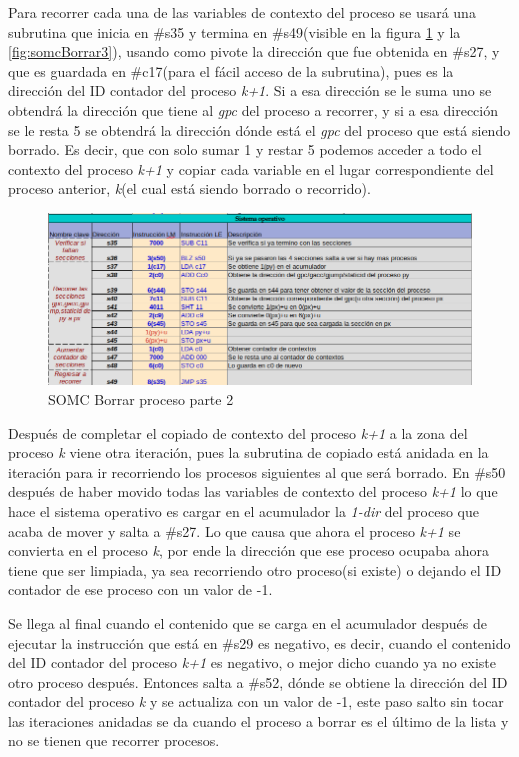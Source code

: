 \documentclass[letterpaper,12pt,oneside]{book}
\begin{document}
		Para recorrer cada una
		de las variables de contexto del proceso se usará una subrutina que 
		inicia en \#s35 y termina en \#s49(visible en la figura \ref{fig:somcBorrar2} y la \ref{fig:somcBorrar3}), usando como pivote la dirección que fue obtenida en \#s27, y que es guardada en
		\#c17(para el fácil acceso de la subrutina), pues es la dirección
		del ID contador del proceso \textit{k+1}. Si a esa dirección se le suma uno se obtendrá la dirección que tiene al \textit{gpc}
		del proceso a recorrer, y si a esa dirección se le resta 5 se obtendrá la dirección dónde está  el \textit{gpc} del proceso que está siendo 
		borrado. Es decir, que con solo sumar 1 y restar 5 podemos acceder a todo el contexto del proceso \textit{k+1} y copiar
		cada variable en el lugar correspondiente del proceso anterior, \textit{k}(el cual está siendo
		borrado o recorrido).
		
		
		\begin{figure}[h]		
			\centering
			\includegraphics[scale=0.53]{media/CARDIACC/SO_Borrar2.png}
			\caption{ SOMC Borrar proceso parte 2}
			\label{fig:somcBorrar2}
		\end{figure}
		
		Después de completar el copiado de contexto del proceso \textit{k+1} a la zona del proceso \textit{k}
		viene otra iteración, pues la subrutina de copiado está anidada en la iteración para
		ir recorriendo los procesos siguientes al que será borrado. En \#s50 después de haber movido todas las variables de contexto del proceso
		\textit{k+1} lo que hace el sistema operativo es cargar en el acumulador la \textit{1-dir} del proceso que acaba de mover y salta a \#s27. Lo 
		que 
		causa
		que ahora el proceso \textit{k+1} se convierta en el proceso \textit{k}, por ende 
		la dirección que ese proceso
		ocupaba ahora tiene que ser limpiada, ya sea recorriendo otro proceso(si existe) o dejando el ID contador de ese proceso
		con un valor de -1. 
		

		Se llega al final cuando el contenido que se carga en el acumulador después de ejecutar la instrucción que está en \#s29 es
		negativo, es decir, cuando el contenido del ID contador del proceso \textit{k+1} es negativo, o mejor dicho
		cuando ya no existe otro proceso después. Entonces salta a \#s52, dónde se obtiene la dirección del ID contador del proceso \textit{k}
		y se actualiza con un valor de -1, este paso salto sin tocar las iteraciones anidadas se da cuando el proceso
		a borrar es el último de la lista y no se tienen que recorrer procesos. 
		
\end{document}
